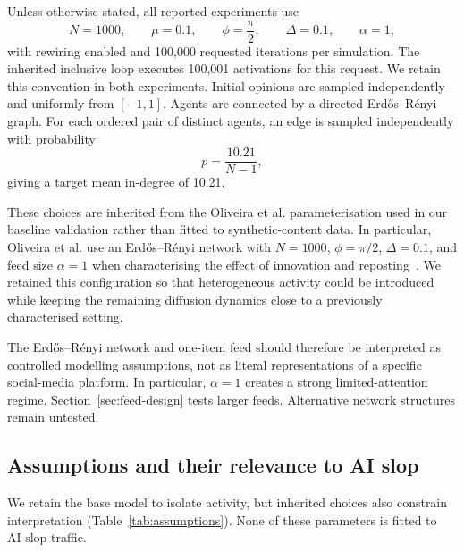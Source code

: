 \documentclass[runningheads]{llncs}
\begin{document}
Unless otherwise stated, all reported experiments use
\[
N=1000,\qquad
\mu=0.1,\qquad
\phi=\frac{\pi}{2},\qquad
\Delta=0.1,\qquad
\alpha=1,
\]
with rewiring enabled and 100,000 requested iterations per simulation. The inherited inclusive loop executes 100,001 activations for this request. We retain this convention in both experiments. Initial
opinions are sampled independently and uniformly from \([-1,1]\). Agents are
connected by a directed Erdős--Rényi graph. For each ordered pair of distinct
agents, an edge is sampled independently with probability
\[
p=\frac{10.21}{N-1},
\]
giving a target mean in-degree of 10.21.

These choices are inherited from the Oliveira et al. parameterisation used in our baseline validation rather than fitted to synthetic-content data. In particular, Oliveira et al. use an Erdős--Rényi network with \(N=1000\), \(\phi=\pi/2\), \(\Delta=0.1\), and feed size \(\alpha=1\) when characterising the effect of innovation and reposting~\cite{oliveira2026}. We retained this configuration so that heterogeneous activity could be introduced while keeping the remaining diffusion dynamics close to a previously characterised setting.

The Erdős--Rényi network and one-item feed should therefore be interpreted as controlled modelling assumptions, not as literal representations of a specific social-media platform. In particular, \(\alpha=1\) creates a strong limited-attention regime. Section~\ref{sec:feed-design} tests larger feeds. Alternative network structures remain untested.

\subsection{Assumptions and their relevance to AI slop}

We retain the base model to isolate activity, but inherited choices also constrain interpretation (Table~\ref{tab:assumptions}). None of these parameters is fitted to AI-slop traffic.
\end{document}
